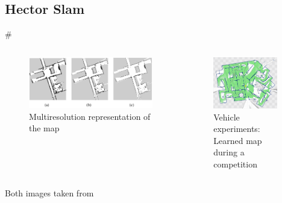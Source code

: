 \documentclass[]{beamer}
\newcommand{\mSlideTitle}{{{\color{gray}\secname}} \# \subsecname}
\begin{document}
\subsection{Hector Slam}
\begin{frame}{\mSlideTitle}
  \vspace{2.0em}
  \begin{columns}
      \begin{figure}
        \centering
        \includegraphics[width=1.05\textwidth]{HectorMultiRes.png}
        \caption{Multiresolution representation of the map}
      \end{figure}
      \begin{figure}
        \centering
        \includegraphics[width=0.9\textwidth]{HectorMap.png}
        \caption{Vehicle experiments: Learned map during a competition}
      \end{figure}
  \end{columns}
  \vspace{3.0em}
  Both images taken from \cite{hector_slam}
\end{frame}
\end{document}
